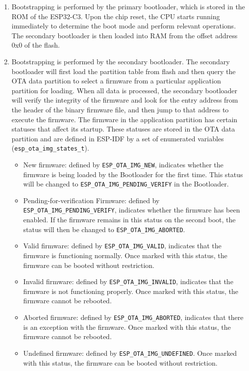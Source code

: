 \documentclass[a4paper,12pt]{book}
\begin{document}
\begin{enumerate}[label=(\arabic*)]
    \item Bootstrapping is performed by the primary bootloader, which is stored in the ROM of the ESP32-C3. Upon the chip reset, the CPU starts running immediately to determine the boot mode and perform relevant operations. The secondary bootloader is then loaded into RAM from the offset address 0x0 of the flash.
    \item Bootstrapping is performed by the secondary bootloader. The secondary bootloader will first load the partition table from flash and then query the OTA data partition to select a firmware from a particular application partition for loading. When all data is processed, the secondary bootloader will verify the integrity of the firmware and look for the entry address from the header of the binary firmware file, and then jump to that address to execute the firmware. The firmware in the application partition has certain statuses that affect its startup. These statuses are stored in the OTA data partition and are defined in ESP-IDF by a set of enumerated variables (\verb|esp_ota_img_states_t|).
    \begin{itemize}[leftmargin=1em]
        \item New firmware: defined by \verb|ESP_OTA_IMG_NEW|, indicates whether the firmware is being loaded by the Bootloader for the first time. This status will be changed to \verb|ESP_OTA_IMG_PENDING_VERIFY| in the Bootloader.
        \item Pending-for-verification Firmware: defined by \verb|ESP_OTA_IMG_PENDING_VERIFY|, indicates whether the firmware has been enabled. If the firmware remains in this status on the second boot, the status will then be changed to \verb|ESP_OTA_IMG_ABORTED|.
        \item Valid firmware: defined by \verb|ESP_OTA_IMG_VALID|, indicates that the firmware is functioning normally. Once marked with this status, the firmware can be booted without restriction.
        \item Invalid firmware: defined by \verb|ESP_OTA_IMG_INVALID|, indicates that the firmware is not functioning properly. Once marked with this status, the firmware cannot be rebooted.
        \item Aborted firmware: defined by \verb|ESP_OTA_IMG_ABORTED|, indicates that there is an exception with the firmware. Once marked with this status, the firmware cannot be rebooted.
        \item Undefined firmware: defined by \verb|ESP_OTA_IMG_UNDEFINED|. Once marked with this status, the firmware can be booted without restriction.

\end{itemize}
\end{enumerate}
\end{document}
